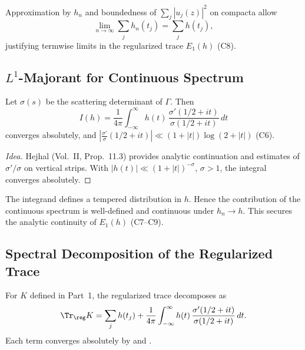 \begin{remark}\label{rem:domconv}\relax
Approximation by $h_n$ and boundedness of $\sum_j |u_j(z)|^2$ on compacta allow
\[
\lim_{n\to\infty}\sum_j h_n(t_j)=\sum_j h(t_j),
\]
justifying termwise limits in the regularized trace $E_1(h)$ (C8). %
\end{remark}

\subsection{$L^1$-Majorant for Continuous Spectrum}\relax\hspace{0pt}
\label{subsec:L1-majorant}\relax\hspace{0pt}

\begin{proposition}\label{prop:L1-majorant}\relax
Let $\sigma(s)$ be the scattering determinant of $\Gamma$. Then
\[
I(h)=\frac{1}{4\pi}\int_{-\infty}^\infty h(t)\,\frac{\sigma'(1/2+it)}{\sigma(1/2+it)}\,dt
\]
converges absolutely, and $|\tfrac{\sigma'}{\sigma}(1/2+it)|\ll (1+|t|)\log(2+|t|)$ (C6). %
\end{proposition}

\begin{proof}[Idea]\relax
Hejhal (Vol.~II, Prop.~11.3) provides analytic continuation and estimates of $\sigma'/\sigma$ on vertical strips.  
With $|h(t)|\ll (1+|t|)^{-\sigma}$, $\sigma>1$, the integral converges absolutely. %
\end{proof}

\begin{remark}\label{rem:continuous}\relax
The integrand defines a tempered distribution in $h$.  
Hence the contribution of the continuous spectrum is well-defined and continuous under $h_n\to h$.  
This secures the analytic continuity of $E_1(h)$ (C7–C9). %
\end{remark}

\subsection{Spectral Decomposition of the Regularized Trace}\relax\hspace{0pt}
\label{subsec:trace-decomp}\relax\hspace{0pt}

\begin{lemma}\label{lem:trace-decomp}\relax
For $K$ defined in Part~1, the regularized trace decomposes as
\[
\Tr_\reg K=\sum_j h(t_j)+\frac{1}{4\pi}\int_{-\infty}^\infty h(t)\,\frac{\sigma'(1/2+it)}{\sigma(1/2+it)}\,dt.
\]
Each term converges absolutely by  and . %
\end{lemma}

